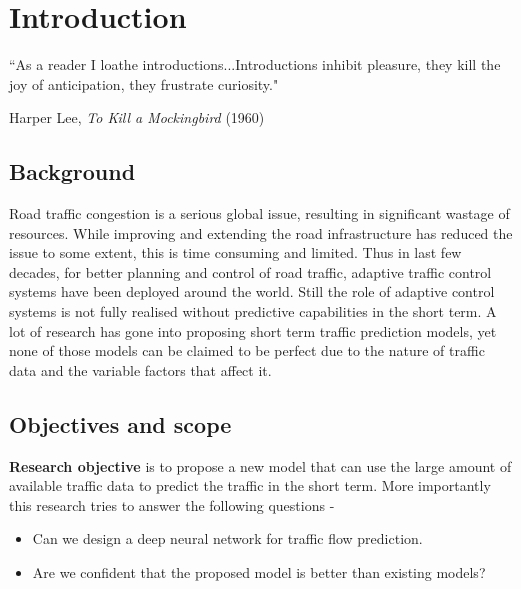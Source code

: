 

\chapter{Introduction} %

\label{Chapter1} %


{``As a reader I loathe introductions...Introductions inhibit pleasure, they kill the joy of
anticipation, they frustrate curiosity."}
\begin{flushright}
Harper Lee, \textit{To Kill a Mockingbird} (1960)
\end{flushright}

\section{Background}
Road traffic congestion is a serious global issue, resulting in significant wastage of resources.
While improving and extending the road infrastructure has reduced the issue to some extent, this is
time consuming and limited. Thus in last few decades, for better planning and control of road
traffic, adaptive traffic control systems have been deployed around the world. Still the role of
adaptive control systems is not fully realised without predictive capabilities in the short term. A
lot of research has gone into proposing short term traffic prediction models, yet none of those
models can be claimed to be perfect due to the nature of traffic data and the variable factors that
affect it.

\section{Objectives and scope}

\textbf{Research objective} is to propose a new model that can use the large amount of available
traffic data to predict the traffic in the short term. More importantly this research tries to answer the following questions -

\begin{itemize}
\item Can we design a deep neural network for traffic flow prediction.
\item Are we confident that the proposed model is better than existing models?
\end{itemize}

